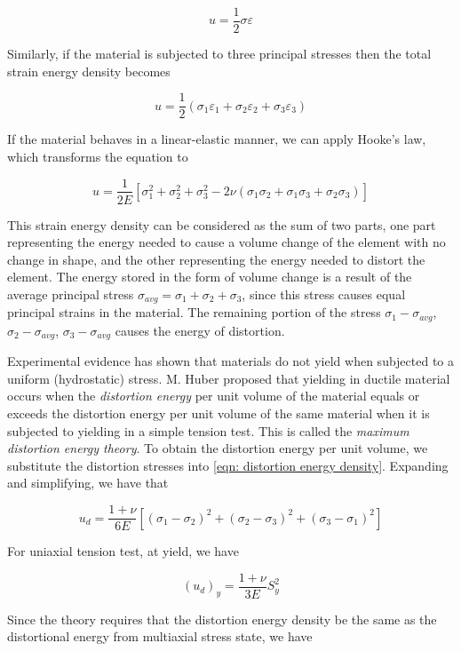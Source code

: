 \documentclass[
10pt,
a4paper,
openany,
svgnames,
]{book}
\begin{document}
\[u = \frac{1}{2}\sigma \varepsilon \]

Similarly, if the material is subjected to three principal stresses then the total strain energy density becomes

\[u = \frac{1}{2}(\sigma_1\varepsilon_1 + \sigma_2\varepsilon_2 + \sigma_3\varepsilon_3)\]

If the material behaves in a linear-elastic manner, we can apply Hooke’s law, which transforms the equation to

\begin{equation} \label{eqn: distortion energy density}
  u = \frac{1}{2E}\left[\sigma_1^2 + \sigma_2^2 + \sigma_3^2 - 2\nu (\sigma_1\sigma_2 + \sigma_1\sigma_3 + \sigma_2\sigma_3)\right]
\end{equation}

This strain energy density can be considered as the sum of two parts, one part representing the energy needed to cause a volume change of the element with no change in shape, and the other representing the energy needed to distort the element. The energy stored in the form of volume change is a result of the average principal stress $\sigma_{avg} = \sigma_1 + \sigma_2 + \sigma_3$, since this stress causes equal principal strains in the material. The remaining portion of the stress $\sigma_1 - \sigma_{avg}$, $\sigma_2 - \sigma_{avg}$, $\sigma_3 - \sigma_{avg}$ causes the energy of distortion.

Experimental evidence has shown that materials do not yield when subjected to a uniform (hydrostatic) stress. M. Huber proposed that yielding in ductile material occurs when the \emph{distortion energy} per unit volume of the material equals or exceeds the distortion energy per unit volume of the same material when it is subjected to yielding in a simple tension test. This is called the \emph{maximum distortion energy theory}.
To obtain the distortion energy per unit volume, we substitute the distortion stresses into \cref{eqn: distortion energy density}. Expanding and simplifying, we have that

\[u_d = \frac{1 + \nu}{6E}\left[ (\sigma_1 - \sigma_2)^2 + (\sigma _2 - \sigma_3)^2 + (\sigma_3 - \sigma_1)^2 \right]\]

For uniaxial tension test, at yield, we have

\[(u_d)_y = \frac{1 + \nu}{3E}S_y^2\]

Since the theory requires that the distortion energy density be the same as the distortional energy from multiaxial stress state, we have
\end{document}
